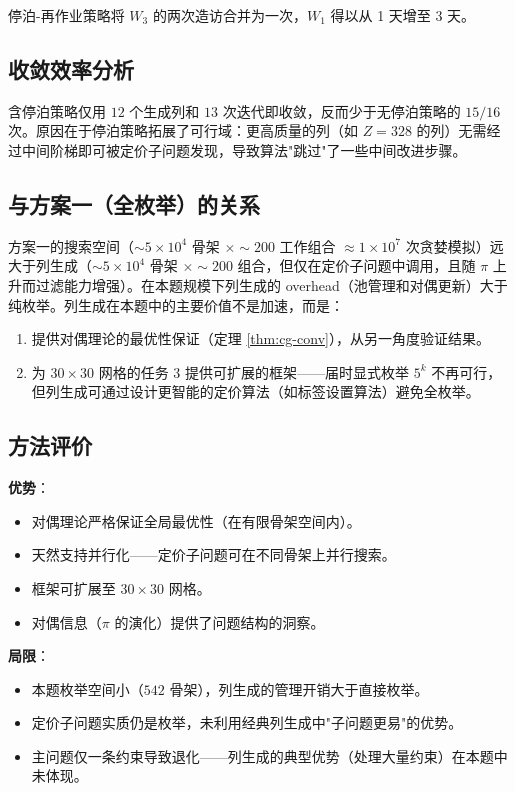 \documentclass[12pt,a4paper]{ctexart}
\theoremstyle{definition}
\begin{document}
停泊-再作业策略将 $W_3$ 的两次造访合并为一次，$W_1$ 得以从 1 天增至 3 天。

\subsection{收敛效率分析}

含停泊策略仅用 $12$ 个生成列和 $13$ 次迭代即收敛，反而少于无停泊策略的 $15/16$ 次。原因在于停泊策略拓展了可行域：更高质量的列（如 $Z=328$ 的列）无需经过中间阶梯即可被定价子问题发现，导致算法"跳过"了一些中间改进步骤。

\subsection{与方案一（全枚举）的关系}

方案一的搜索空间（$\sim 5\times 10^4$ 骨架 $\times\sim 200$ 工作组合 $\approx 1\times 10^7$ 次贪婪模拟）远大于列生成（$\sim 5\times 10^4$ 骨架 $\times\sim 200$ 组合，但仅在定价子问题中调用，且随 $\pi$ 上升而过滤能力增强）。在本题规模下列生成的 overhead（池管理和对偶更新）大于纯枚举。列生成在本题中的主要价值不是加速，而是：
\begin{enumerate}
  \item 提供对偶理论的最优性保证（定理 \ref{thm:cg-conv}），从另一角度验证结果。
  \item 为 $30\times 30$ 网格的任务 3 提供可扩展的框架——届时显式枚举 $5^k$ 不再可行，但列生成可通过设计更智能的定价算法（如标签设置算法）避免全枚举。
\end{enumerate}

\subsection{方法评价}

\textbf{优势}：
\begin{itemize}
  \item 对偶理论严格保证全局最优性（在有限骨架空间内）。
  \item 天然支持并行化——定价子问题可在不同骨架上并行搜索。
  \item 框架可扩展至 $30\times 30$ 网格。
  \item 对偶信息（$\pi$ 的演化）提供了问题结构的洞察。
\end{itemize}

\textbf{局限}：
\begin{itemize}
  \item 本题枚举空间小（$542$ 骨架），列生成的管理开销大于直接枚举。
  \item 定价子问题实质仍是枚举，未利用经典列生成中"子问题更易"的优势。
  \item 主问题仅一条约束导致退化——列生成的典型优势（处理大量约束）在本题中未体现。
\end{itemize}
\end{document}
